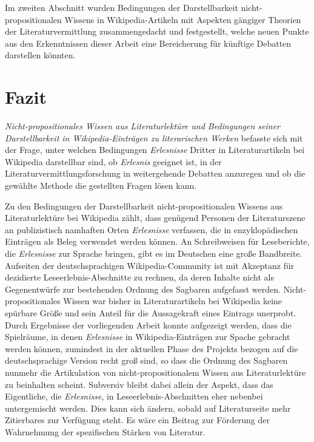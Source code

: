 \documentclass[fontsize=12pt]{scrartcl}
\begin{document}
{{{{Im zwei\-ten Abschnitt wurden Bedingungen der Darstellbarkeit nicht-pro\-po\-si\-ti\-o\-na\-len Wissens in Wi\-ki\-pe\-dia-Artikeln mit Aspekten g\"angiger Theorien der Li\-te\-ra\-tur\-ver\-mitt\-lung zu\-sam\-men\-gedacht und festgestellt, welche neuen Punkte aus den Er\-kennt\-nis\-sen dieser Arbeit eine Bereicherung f\"ur k\"unftige Debatten dar\-stel\-len k\"onnten.

\newpage
\section{Fazit}
\label{sec:8}

\textit{Nicht-pro\-po\-si\-ti\-o\-na\-les Wissen aus Li\-te\-ra\-tur\-lekt\"ure und Bedingungen seiner Darstellbarkeit in Wi\-ki\-pe\-dia-Eintr\"agen zu li\-te\-ra\-rischen Werken} befasste sich mit der Frage, unter welchen Bedingungen \textit{Erlesnisse} Dritter in Li\-te\-ra\-tur\-artikeln bei Wi\-ki\-pe\-dia darstellbar sind, ob \textit{Erlesnis} ge\-eig\-net ist, in der Li\-te\-ra\-tur\-ver\-mitt\-lungsfor\-schung in weitergehende Debatten anzuregen und ob die gew\"ahlte Methode die gestellten Fragen l\"osen kann.

Zu den Bedingungen der Darstellbarkeit nicht-pro\-po\-si\-ti\-o\-na\-len Wissens aus Li\-te\-ra\-tur\-lekt\"ure bei Wi\-ki\-pe\-dia z\"ahlt, dass gen\"ugend Per\-so\-nen der Li\-te\-ra\-tur\-szene an publizistisch namhaften Orten \textit{Erlesnisse} verfassen, die in enzy\-klop\"adischen Eintr\"agen als Beleg verwendet werden k\"onnen. An Schreibweisen f\"ur Leseberichte, die \textit{Erlesnisse} zur Sprache bringen, gibt es im Deutschen eine gro{\ss}e Bandbreite. Aufsei\-ten der deutschspra\-chi\-gen Wi\-ki\-pe\-dia-Community ist mit Akzeptanz f\"ur dezidierte Leseerlebnis-Abschnitte zu rechnen, da deren Inhalte nicht als Gegenentw\"urfe zur bestehenden Ordnung des Sagbaren aufgefasst werden. Nicht-pro\-po\-si\-ti\-o\-na\-les Wissen war bis\-her in Li\-te\-ra\-tur\-artikeln bei Wi\-ki\-pe\-dia keine sp\"urbare Gr\"o{\ss}e und sein Anteil f\"ur die Aussagekraft eines Eintrags unerprobt. Durch Ergebnisse der vorliegenden Arbeit konnte aufgezeigt werden, dass die Spielr\"aume, in denen \textit{Erlesnisse} in Wi\-ki\-pe\-dia-Eintr\"agen zur Spache gebracht werden k\"onnen, zumindest in der aktuellen Phase des Projekts bezogen auf die deutschspra\-chi\-ge Version recht gro{\ss} sind, so dass die Ordnung des Sagbaren nunmehr die Artikulation von nicht-pro\-po\-si\-ti\-o\-na\-lem Wissen aus Li\-te\-ra\-tur\-lekt\"ure zu beinhalten scheint. Subversiv bleibt dabei allein der Aspekt, dass das Eigentliche, die \textit{Erlesnisse}, in Leseerlebnis-Abschnitten eher nebenbei untergemischt werden. Dies kann sich \"andern, sobald auf Li\-te\-ra\-tur\-seite mehr Zitierbares zur Verf\"ugung steht. Es w\"are ein Beitrag zur F\"orderung der Wahrnehmung der spezifischen St\"arken von Li\-te\-ra\-tur.

}}}}
\end{document}
